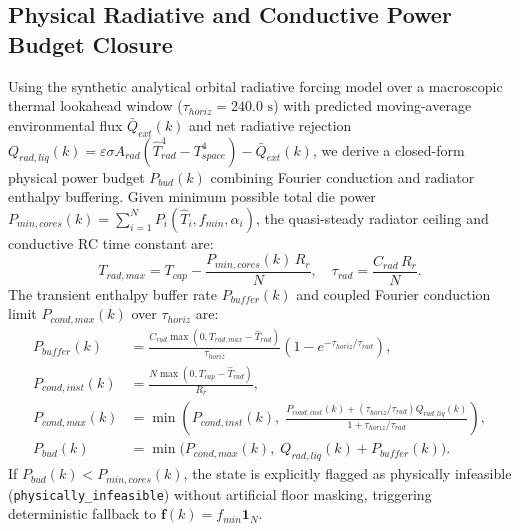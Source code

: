 \documentclass[a4paper,fleqn]{cas-dc}
\begin{document}
\subsection{Physical Radiative and Conductive Power Budget Closure}
Using the synthetic analytical orbital radiative forcing model over a macroscopic thermal lookahead window ($\tau_{horiz} = 240.0\text{ s}$) with predicted moving-average environmental flux $\bar{Q}_{ext}(k)$ and net radiative rejection $Q_{rad,liq}(k) = \varepsilon\sigma A_{rad}(\hat{T}_{rad}^4 - T_{space}^4) - \bar{Q}_{ext}(k)$, we derive a closed-form physical power budget $P_{bud}(k)$ combining Fourier conduction and radiator enthalpy buffering. Given minimum possible total die power $P_{min,cores}(k) = \sum_{i=1}^N P_i(\hat{T}_i, f_{min}, \alpha_i)$, the quasi-steady radiator ceiling and conductive RC time constant are:
\begin{equation}
T_{rad,max} = T_{cap} - \frac{P_{min,cores}(k)\, R_r}{N}, \quad \tau_{rad} = \frac{C_{rad}\, R_r}{N}.
\end{equation}
The transient enthalpy buffer rate $P_{buffer}(k)$ and coupled Fourier conduction limit $P_{cond,max}(k)$ over $\tau_{horiz}$ are:
\begin{align}
P_{buffer}(k) &= \frac{C_{rad} \max(0, T_{rad,max} - \hat{T}_{rad})}{\tau_{horiz}}\left(1 - e^{-\tau_{horiz}/\tau_{rad}}\right), \\
P_{cond,inst}(k) &= \frac{N \max(0, T_{cap} - \hat{T}_{rad})}{R_r}, \\
P_{cond,max}(k) &= \min\!\left(P_{cond,inst}(k),\; \frac{P_{cond,inst}(k) + (\tau_{horiz}/\tau_{rad}) Q_{rad,liq}(k)}{1 + \tau_{horiz}/\tau_{rad}}\right), \\
P_{bud}(k) &= \min\!\big(P_{cond,max}(k),\; Q_{rad,liq}(k) + P_{buffer}(k)\big).
\end{align}
If $P_{bud}(k) < P_{min,cores}(k)$, the state is explicitly flagged as physically infeasible (\texttt{physically\_infeasible}) without artificial floor masking, triggering deterministic fallback to $\mathbf{f}(k) = f_{min}\mathbf{1}_N$.
\end{document}
